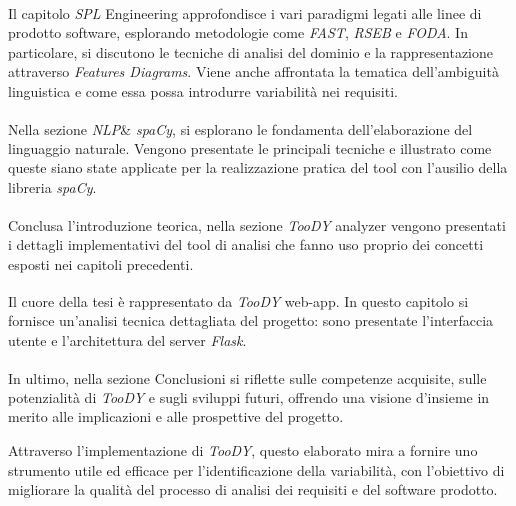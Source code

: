 \documentclass[12pt]{report}
\newcommand{\torevise}[1]{\textcolor{red}{#1}}
\newcommand{\myref}[1]{\textsuperscript{\hyperref[#1]{\ding{70}}}}
\newcommand{\toody}{\textsl{TooDY}\xspace}
\newcommand{\flask}{\textsl{Flask}\xspace}
\newcommand{\spacy}{\textsl{spaCy}\xspace}
\newcommand{\spl}{\textsl{SPL}\xspace}
\newcommand{\nlp}{\textsl{NLP}\xspace}
\begin{document}
\begin{mdframed}
\small
Il capitolo \textsf{\spl Engineering}\myref{ch:sple} approfondisce i vari paradigmi legati alle linee di prodotto software, esplorando metodologie come \textit{FAST}, \textit{RSEB} e \textit{FODA}. In particolare, si discutono le tecniche di analisi del dominio e la rappresentazione attraverso \textit{Features Diagrams}. Viene anche affrontata la tematica dell’ambiguità linguistica e come essa possa introdurre variabilità nei requisiti.

\vspace{0.25cm}

Nella sezione \textsf{\nlp \& \spacy}\myref{ch:nlp}, si esplorano le fondamenta dell'elaborazione del linguaggio naturale. Vengono presentate le principali tecniche e illustrato come queste siano state applicate per la realizzazione pratica del tool con l'ausilio della libreria \spacy.

\vspace{0.25cm}

Conclusa l'introduzione teorica, nella sezione \textsf{\toody analyzer}\myref{ch:parser} vengono presentati i dettagli implementativi del tool di analisi che fanno uso proprio dei concetti esposti nei capitoli precedenti.

\vspace{0.25cm}

Il cuore della tesi è rappresentato da \textsf{\toody web-app}\myref{ch:architettura}. In questo capitolo si fornisce un'analisi tecnica dettagliata del progetto: sono presentate l’interfaccia utente e l'architettura del server \flask.

\vspace{0.25cm}

In ultimo, nella sezione \textsf{Conclusioni}\myref{ch:conclusioni} si riflette sulle competenze acquisite, sulle potenzialità di \toody e sugli sviluppi futuri, offrendo una visione d'insieme in merito alle implicazioni e alle prospettive del progetto.
\end{mdframed}


\noindent Attraverso l’implementazione di \toody, questo elaborato mira a fornire uno strumento utile ed efficace per l’identificazione della variabilità, con l’obiettivo di migliorare la qualità del processo di analisi dei requisiti e del software prodotto.
\end{document}
